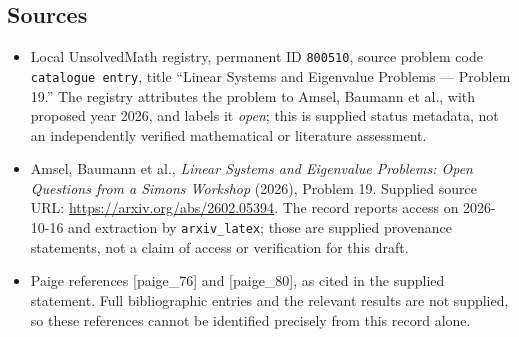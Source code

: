 \documentclass[11pt]{article}
\begin{document}
\subsection{Sources}
\begin{itemize}
\item Local UnsolvedMath registry, permanent ID \texttt{800510}, source problem code \texttt{catalogue entry}, title ``Linear Systems and Eigenvalue Problems --- Problem 19.'' The registry attributes the problem to Amsel, Baumann et al., with proposed year 2026, and labels it \emph{open}; this is supplied status metadata, not an independently verified mathematical or literature assessment.
\item Amsel, Baumann et al., \emph{Linear Systems and Eigenvalue Problems: Open Questions from a Simons Workshop} (2026), Problem 19. Supplied source URL: \url{https://arxiv.org/abs/2602.05394}. The record reports access on 2026-10-16 and extraction by \texttt{arxiv\_latex}; those are supplied provenance statements, not a claim of access or verification for this draft.
\item Paige references [paige\_76] and [paige\_80], as cited in the supplied statement. Full bibliographic entries and the relevant results are not supplied, so these references cannot be identified precisely from this record alone.
\end{itemize}
\end{document}
